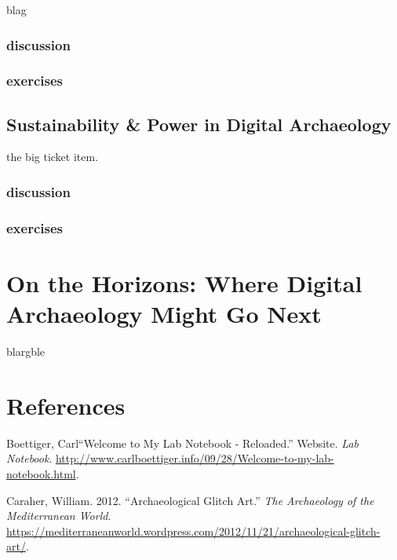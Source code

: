 \documentclass[english,]{book}
\begin{document}
blag

\subsection{discussion}\label{discussion-15}

\subsection{exercises}\label{exercises-20}

\section{Sustainability \& Power in Digital
Archaeology}\label{sustainability-power-in-digital-archaeology}

the big ticket item.

\subsection{discussion}\label{discussion-16}

\subsection{exercises}\label{exercises-21}

\chapter{On the Horizons: Where Digital Archaeology Might Go
Next}\label{on-the-horizons-where-digital-archaeology-might-go-next}

blargble

\chapter*{References}\label{references}

\hypertarget{refs}{}
\hypertarget{ref-boettiger_welcome_0000}{}
Boettiger, Carl``Welcome to My Lab Notebook - Reloaded.'' Website.
\emph{Lab Notebook}.
\url{http://www.carlboettiger.info/09/28/Welcome-to-my-lab-notebook.html}.

\hypertarget{ref-caraher_archaeological_2012}{}
Caraher, William. 2012. ``Archaeological Glitch Art.'' \emph{The
Archaeology of the Mediterranean World}.
\url{https://mediterraneanworld.wordpress.com/2012/11/21/archaeological-glitch-art/}.
\end{document}

